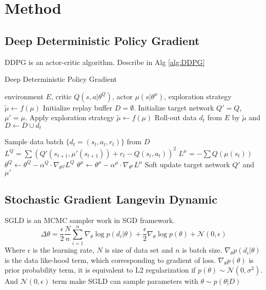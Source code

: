 \section{Method}
\subsection{Deep Deterministic Policy Gradient}
DDPG is an actor-critic algorithm. Describe in Alg \ref{alg:DDPG}
\begin{algorithm}[tb]
   \caption{Deep Deterministic Policy Gradient}
   \label{alg:DDPG}
\begin{algorithmic}
    environment $E$, critic $Q(s,a|\theta^Q)$, actor $\mu(s|\theta^\mu)$, exploration strategy $\tilde\mu \leftarrow f(\mu)$
   \STATE Initialize replay buffer $D = \emptyset$.
   \STATE Initialize target network $Q'= Q$, $\mu'= \mu$.
   \STATE Apply exploration strategy $\tilde\mu \leftarrow f(\mu)$
   \STATE Roll-out data $d_t$ from $E$ by $\tilde\mu$ and $D \leftarrow D\cup {d_t}$

   \STATE Sample data batch $\{d_t=(s_t,a_t,r_t)\}$ from $D$
   \STATE $L^Q=\sum(Q'(s_{t+1},\mu'(s_{t+1}))+r_t-Q(s_t,a_t))^2$
   \STATE $L^\mu=-\sum Q(\mu(s_t))$
   \STATE $\theta^Q \leftarrow \theta^Q - \alpha^Q\cdot\nabla_{\theta^Q} L^Q$
   \STATE $\theta^\mu \leftarrow \theta^\mu -\alpha^\mu\cdot\nabla_{\theta^\mu} L^\mu$
   \STATE Soft update target network $Q'$ and $\mu'$
   \ENDFOR
   \ENDFOR
\end{algorithmic}
\end{algorithm}

\subsection{Stochastic Gradient Langevin Dynamic}
SGLD is an MCMC sampler work in SGD framework.
\[\Delta\theta =\frac{\epsilon}{2}\frac{N}{n}\sum_{i=1}^{n}\nabla_\theta\log p(d_i|\theta)+\frac{\epsilon}{2}\nabla_\theta\log p(\theta)+\mathcal{N}(0,\epsilon) \]
Where $\epsilon$ is the learning rate, $N$ is size of data set  and $n$ is batch size. $\nabla_\theta p(d_i|\theta)$ is the data like-hood term, which corresponding to gradient of loss. $\nabla_\theta p(\theta)$ is prior probability term, it is equivalent to L2 regularization if $p(\theta)\sim\mathcal{N}(0,\sigma^2)$. And $\mathcal{N}(0,\epsilon)$ term make SGLD can sample parameters with $\theta \sim p(\theta|D)$

